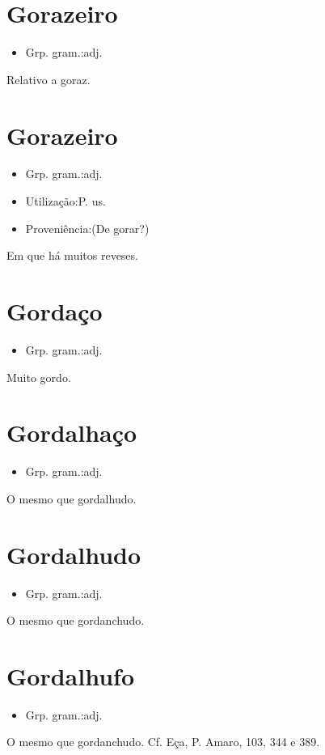 \section{Gorazeiro}
\begin{itemize}
\item {Grp. gram.:adj.}
\end{itemize}
Relativo a goraz.
\section{Gorazeiro}
\begin{itemize}
\item {Grp. gram.:adj.}
\end{itemize}
\begin{itemize}
\item {Utilização:P. us.}
\end{itemize}
\begin{itemize}
\item {Proveniência:(De \textunderscore gorar\textunderscore ?)}
\end{itemize}
Em que há muitos reveses.
\section{Gordaço}
\begin{itemize}
\item {Grp. gram.:adj.}
\end{itemize}
Muito gordo.
\section{Gordalhaço}
\begin{itemize}
\item {Grp. gram.:adj.}
\end{itemize}
O mesmo que \textunderscore gordalhudo\textunderscore .
\section{Gordalhudo}
\begin{itemize}
\item {Grp. gram.:adj.}
\end{itemize}
O mesmo que \textunderscore gordanchudo\textunderscore .
\section{Gordalhufo}
\begin{itemize}
\item {Grp. gram.:adj.}
\end{itemize}
O mesmo que \textunderscore gordanchudo\textunderscore . Cf. Eça, \textunderscore P. Amaro\textunderscore , 103, 344 e 389.
